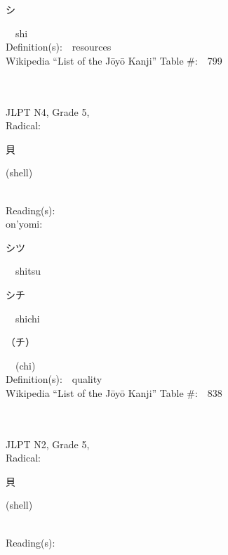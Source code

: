 \begin{multicols}{2}
{\hspace*{2em}}{\begin{CJK}{UTF8}{min} シ \end{CJK}}\ \ shi\ \ \\
Definition(s):\ \ resources \\
Wikipedia ``List of the J\=oy\=o Kanji'' Table \#:\ \ 799 \\
\ \ \\
{\fontsize{34pt}{40pt}  }\ \ \\  %
{JLPT N4, Grade 5, \\Radical:\ \ {\begin{CJK}{UTF8}{min} 貝 \end{CJK}} (shell) } \\
Reading(s):\ \ \\
{\hspace*{1em}}on'yomi:\ \ \\
{\hspace*{2em}}{\begin{CJK}{UTF8}{min} シツ \end{CJK}}\ \ shitsu\ \ \\
{\hspace*{2em}}{\begin{CJK}{UTF8}{min} シチ \end{CJK}}\ \ shichi\ \ \\
{\hspace*{2em}}{\begin{CJK}{UTF8}{min} （チ） \end{CJK}}\ \ (chi)\ \ \\
Definition(s):\ \ quality \\
Wikipedia ``List of the J\=oy\=o Kanji'' Table \#:\ \ 838 \\
\ \ \\
{\fontsize{34pt}{40pt}  }\ \ \\  %
{JLPT N2, Grade 5, \\Radical:\ \ {\begin{CJK}{UTF8}{min} 貝 \end{CJK}} (shell) } \\
Reading(s):\ \ \\

\end{multicols}
